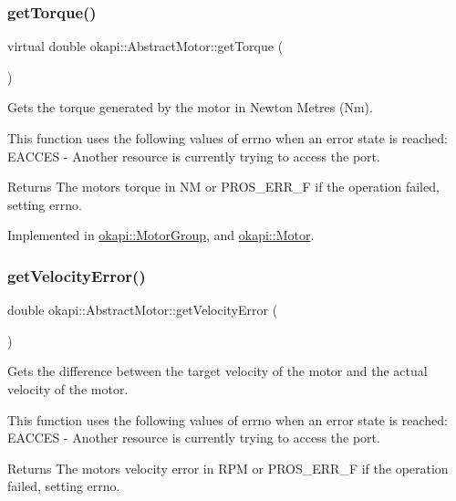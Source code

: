 \subsubsection{\texorpdfstring{getTorque()}{getTorque()}}
{\footnotesize\ttfamily virtual double okapi\+::\+Abstract\+Motor\+::get\+Torque (\begin{DoxyParamCaption}{ }\end{DoxyParamCaption})\hspace{0.3cm}{\ttfamily [pure virtual]}}

Gets the torque generated by the motor in Newton Metres (Nm).

This function uses the following values of errno when an error state is reached\+: E\+A\+C\+C\+ES -\/ Another resource is currently trying to access the port.

\begin{DoxyReturn}{Returns}
The motor\textquotesingle{}s torque in NM or P\+R\+O\+S\+\_\+\+E\+R\+R\+\_\+F if the operation failed, setting errno. 
\end{DoxyReturn}


Implemented in \mbox{\hyperlink{classokapi_1_1MotorGroup_a591e2ac0cc80b58f6b5b767c5d0128c5}{okapi\+::\+Motor\+Group}}, and \mbox{\hyperlink{classokapi_1_1Motor_a4a8c14c49ae44d687772ff41591fdf1d}{okapi\+::\+Motor}}.

\mbox{\label{classokapi_1_1AbstractMotor_ada65f68f96d4e69b6740bd59e8418f94}} 
\subsubsection{\texorpdfstring{getVelocityError()}{getVelocityError()}}
{\footnotesize\ttfamily double okapi\+::\+Abstract\+Motor\+::get\+Velocity\+Error (\begin{DoxyParamCaption}{ }\end{DoxyParamCaption})}

Gets the difference between the target velocity of the motor and the actual velocity of the motor.

This function uses the following values of errno when an error state is reached\+: E\+A\+C\+C\+ES -\/ Another resource is currently trying to access the port.

\begin{DoxyReturn}{Returns}
The motor\textquotesingle{}s velocity error in R\+PM or P\+R\+O\+S\+\_\+\+E\+R\+R\+\_\+F if the operation failed, setting errno. 
\end{DoxyReturn}
\mbox{\label{classokapi_1_1AbstractMotor_a855b35b508e90074f21662b06ad2a0c8}} 
